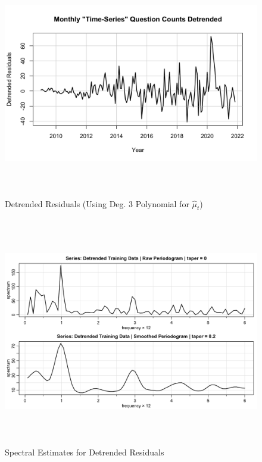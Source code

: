 \documentclass[10pt]{article}
\begin{document}
\begin{figure}[ht!]
    \centering
    \includegraphics[height=100mm, width=125mm]{detrended_residuals.png}
    \caption{Detrended Residuals (Using Deg. 3 Polynomial for $\hat \mu_t$)}
\end{figure}

\begin{figure}[ht!]
    \centering
    \includegraphics[height=100mm, width=125mm]{nonparam-spec.png}
    \caption{Spectral Estimates for Detrended Residuals}
\end{figure}
\end{document}
